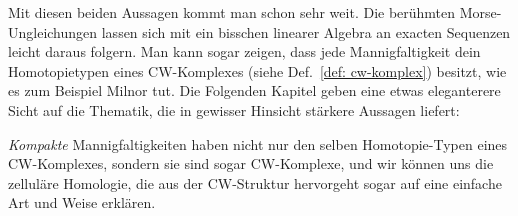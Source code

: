 Mit diesen beiden Aussagen kommt man schon sehr weit. Die berühmten Morse- \\Ungleichungen lassen
sich mit ein bisschen linearer Algebra an exacten Sequenzen leicht daraus folgern. Man kann sogar
zeigen, dass jede Mannigfaltigkeit dein Homotopietypen eines CW-Komplexes 
(siehe Def.~\ref{def: cw-komplex}) besitzt, wie es zum Beispiel Milnor tut. Die Folgenden Kapitel 
geben eine etwas eleganterere Sicht auf die Thematik, die in gewisser Hinsicht stärkere Aussagen
liefert:

\textit{Kompakte} Mannigfaltigkeiten haben nicht nur den selben Homotopie-Typen eines CW-Komplexes, 
sondern sie sind sogar CW-Komplexe, und wir können uns die zelluläre Homologie, die aus der 
CW-Struktur hervorgeht sogar auf eine einfache Art und Weise erklären.